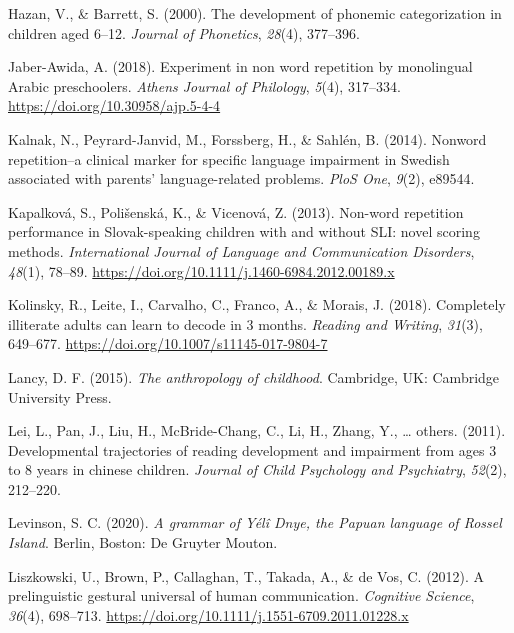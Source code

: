 \documentclass[english,,man,floatsintext]{apa6}
\begin{document}
\leavevmode\hypertarget{ref-hazan2000development}{}%
Hazan, V., \& Barrett, S. (2000). The development of phonemic categorization in children aged 6--12. \emph{Journal of Phonetics}, \emph{28}(4), 377--396.

\leavevmode\hypertarget{ref-jabere2018xperiment}{}%
Jaber-Awida, A. (2018). Experiment in non word repetition by monolingual Arabic preschoolers. \emph{Athens Journal of Philology}, \emph{5}(4), 317--334. \url{https://doi.org/10.30958/ajp.5-4-4}

\leavevmode\hypertarget{ref-kalnak2014nonword}{}%
Kalnak, N., Peyrard-Janvid, M., Forssberg, H., \& Sahlén, B. (2014). Nonword repetition--a clinical marker for specific language impairment in Swedish associated with parents' language-related problems. \emph{PloS One}, \emph{9}(2), e89544.

\leavevmode\hypertarget{ref-kapalkova2013non}{}%
Kapalková, S., Polišenská, K., \& Vicenová, Z. (2013). Non-word repetition performance in Slovak-speaking children with and without SLI: novel scoring methods. \emph{International Journal of Language and Communication Disorders}, \emph{48}(1), 78--89. \url{https://doi.org/10.1111/j.1460-6984.2012.00189.x}

\leavevmode\hypertarget{ref-kolinsky2018completely}{}%
Kolinsky, R., Leite, I., Carvalho, C., Franco, A., \& Morais, J. (2018). Completely illiterate adults can learn to decode in 3 months. \emph{Reading and Writing}, \emph{31}(3), 649--677. \url{https://doi.org/10.1007/s11145-017-9804-7}

\leavevmode\hypertarget{ref-lancy2015anthropology}{}%
Lancy, D. F. (2015). \emph{The anthropology of childhood}. Cambridge, UK: Cambridge University Press.

\leavevmode\hypertarget{ref-lei2011developmental}{}%
Lei, L., Pan, J., Liu, H., McBride-Chang, C., Li, H., Zhang, Y., \ldots{} others. (2011). Developmental trajectories of reading development and impairment from ages 3 to 8 years in chinese children. \emph{Journal of Child Psychology and Psychiatry}, \emph{52}(2), 212--220.

\leavevmode\hypertarget{ref-levinsonYDgrammar}{}%
Levinson, S. C. (2020). \emph{A grammar of Yélî Dnye, the Papuan language of Rossel Island}. Berlin, Boston: De Gruyter Mouton.

\leavevmode\hypertarget{ref-liszkowski2012prelinguistic}{}%
Liszkowski, U., Brown, P., Callaghan, T., Takada, A., \& de Vos, C. (2012). A prelinguistic gestural universal of human communication. \emph{Cognitive Science}, \emph{36}(4), 698--713. \url{https://doi.org/10.1111/j.1551-6709.2011.01228.x}
\end{document}
